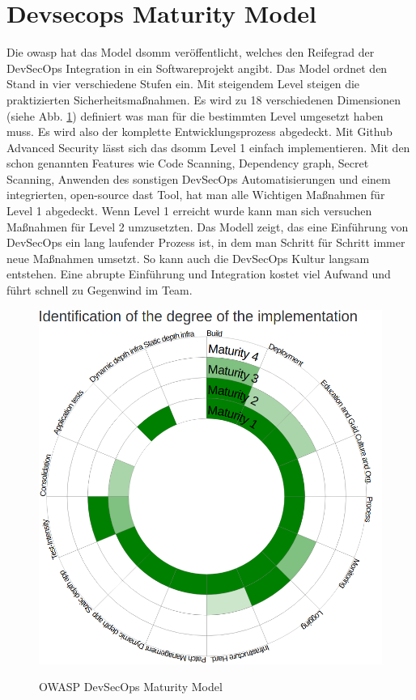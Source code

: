 \section{Devsecops Maturity Model}
Die \ac{owasp} hat das Model \ac{dsomm} veröffentlicht, welches den Reifegrad der DevSecOps Integration in ein Softwareprojekt angibt. Das Model ordnet den Stand in vier verschiedene Stufen ein. Mit steigendem Level steigen die praktizierten Sicherheitsmaßnahmen. Es wird zu 18 verschiedenen Dimensionen (siehe Abb. \ref{FIG:dsomm-levels}) definiert was man für die bestimmten Level umgesetzt haben muss. Es wird also der komplette Entwicklungsprozess abgedeckt. \cite{owasp-dsomm} Mit Github Advanced Security lässt sich das \ac{dsomm} Level 1 einfach implementieren. Mit den schon genannten Features wie Code Scanning, Dependency graph, Secret Scanning, Anwenden des sonstigen DevSecOps Automatisierungen und einem integrierten, open-source \ac{dast} Tool, hat man alle Wichtigen Maßnahmen für Level 1 abgedeckt. Wenn Level   1 erreicht wurde kann man sich versuchen Maßnahmen für Level 2 umzusetzten. \cite{Alwell2020-ar} Das Modell zeigt, das eine Einführung von DevSecOps ein lang laufender Prozess ist, in dem man Schritt für Schritt immer neue Maßnahmen umsetzt. So kann auch die DevSecOps Kultur langsam entstehen. Eine abrupte Einführung und Integration kostet viel Aufwand und führt schnell zu Gegenwind im Team.
\begin{figure}[H]
	{\caption{OWASP DevSecOps Maturity Model}
		\label{FIG:dsomm-levels}}
	{\includegraphics[width=1\textwidth]{figures/DSOMM.png}}
\end{figure}

